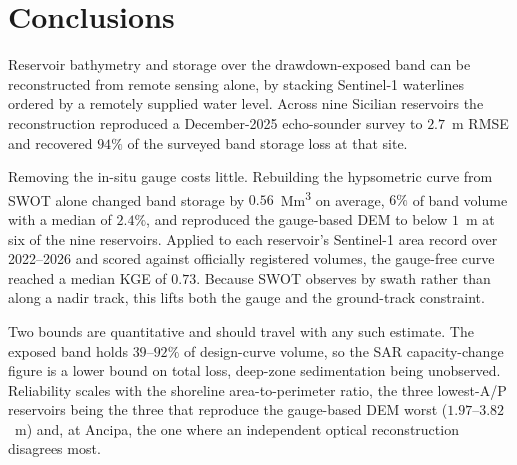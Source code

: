 \section{Conclusions}
\label{sec:conclusions}

Reservoir bathymetry and storage over the drawdown-exposed band can be reconstructed
from remote sensing alone, by stacking Sentinel-1 waterlines ordered by a remotely
supplied water level. Across nine Sicilian reservoirs the reconstruction reproduced a
December-2025 echo-sounder survey to $2.7$~m RMSE and recovered $94\%$ of the surveyed
band storage loss at that site.

Removing the in-situ gauge costs little. Rebuilding the hypsometric curve from SWOT
alone changed band storage by $0.56$~\si{Mm^3} on average, $6\%$ of band volume with a
median of $2.4\%$, and reproduced the gauge-based DEM to below $1$~m at six of the nine
reservoirs. Applied to each reservoir's Sentinel-1 area record over 2022--2026 and scored
against officially registered volumes, the gauge-free curve reached a median KGE of $0.73$.
Because SWOT observes by swath rather than along a nadir track, this lifts both the gauge
and the ground-track constraint.

Two bounds are quantitative and should travel with any such estimate. The exposed band
holds $39$--$92\%$ of design-curve volume, so the SAR capacity-change figure is a lower
bound on total loss, deep-zone sedimentation being unobserved. Reliability scales with
the shoreline area-to-perimeter ratio, the three lowest-A/P reservoirs being the three
that reproduce the gauge-based DEM worst ($1.97$--$3.82$~m) and, at Ancipa, the one
where an independent optical reconstruction disagrees most.
